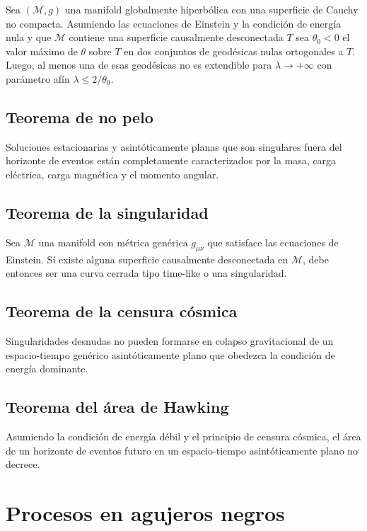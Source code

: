 \documentclass[../main]{subfiles}
\begin{document}
\begin{adjustwidth}{0pt}{-100pt}
\teorema{} Sea $(\mathcal{M}, g)$ una manifold globalmente hiperbólica con una superficie de Cauchy no compacta. Asumiendo las ecuaciones de Einstein y la condición de energía nula y que $\mathcal{M}$ contiene una superficie causalmente desconectada $T$ sea $\theta_0<0$ el valor máximo de $\theta$ sobre $T$ en dos conjuntos de geodésicas nulas ortogonales a $T$. Luego, al menos una de esas geodésicas no es extendible para $\lambda \rightarrow + \infty$ con parámetro afín $\lambda \leq 2/\theta_0$.

\subsection{Teorema de no pelo}

\teorema{} Soluciones estacionarias y asintóticamente planas que son singulares fuera del horizonte de eventos están completamente caracterizados por la masa, carga eléctrica, carga magnética y el momento angular.

\subsection{Teorema de la singularidad}

\teorema{} Sea $\mathcal{M}$ una manifold con métrica genérica $g_{\mu\nu}$ que satisface las ecuaciones de Einstein. Sí existe alguna superficie causalmente desconectada en $\mathcal{M}$, debe entonces ser una curva cerrada tipo time-like o una singularidad.

\subsection{Teorema de la censura cósmica}

\teorema{} Singularidades desnudas no pueden formarse en colapso gravitacional de un espacio-tiempo genérico asintóticamente plano que obedezca la condición de energía dominante.

\subsection{Teorema del área de Hawking}

\teorema{} Asumiendo la condición de energía débil y el principio de censura cósmica, el área de un horizonte de eventos futuro en un espacio-tiempo asintóticamente plano no decrece.

\section{Procesos en agujeros negros}\label{part6.8}


\end{adjustwidth}
\end{document}
